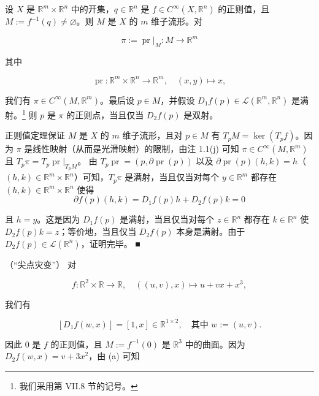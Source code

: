 \begin{example}

\begin{items}
\item

设 $ X $ 是 $ \mathbb{R}^m \times \mathbb{R}^n $ 中的开集，$ q \in \mathbb{R}^n $ 是 $ f \in C^\infty(X, \mathbb{R}^n) $ 的正则值，且 $ M := f^{-1}(q) \ne \varnothing $。则 $ M $ 是 $ X $ 的 $ m $ 维子流形。对

\[
\pi := \operatorname{pr}|_M : M \to \mathbb{R}^m
\]

其中

\[
\operatorname{pr}: \mathbb{R}^m \times \mathbb{R}^n \to \mathbb{R}^m, \quad (x, y) \mapsto x,
\]

我们有 $ \pi \in C^\infty(M, \mathbb{R}^m) $。最后设 $ p \in M $，并假设 $ D_1 f(p) \in \mathcal{L}(\mathbb{R}^m, \mathbb{R}^n) $ 是满射。\footnote{我们采用第 VII.8 节的记号。} 则 $ p $ 是 $ \pi $ 的正则点，当且仅当 $ D_2 f(p) $ 是双射。

\proofhead
正则值定理保证 $ M $ 是 $ X $ 的 $ m $ 维子流形，且对 $ p \in M $ 有 $ T_p M = \ker(T_p f) $。因为 $ \pi $ 是线性映射（从而是光滑映射）的限制，由注 1.1(j) 可知 $ \pi \in C^\infty(M, \mathbb{R}^m) $ 且 $ T_p \pi = T_p \operatorname{pr}|_{T_p M} $。
由 $ T_p \operatorname{pr} = (p, \partial \operatorname{pr}(p)) $ 以及 $ \partial \operatorname{pr}(p)(h, k) = h $（$ (h, k) \in \mathbb{R}^m \times \mathbb{R}^n $）可知，$ T_p \pi $ 是满射，当且仅当对每个 $ y \in \mathbb{R}^m $ 都存在 $ (h, k) \in \mathbb{R}^m \times \mathbb{R}^n $ 使得
\[
\partial f(p)(h, k) = D_1 f(p)h + D_2 f(p)k = 0
\]

且 $ h = y $。这是因为 $ D_1 f(p) $ 是满射，当且仅当对每个 $ z \in \mathbb{R}^n $ 都存在 $ k \in \mathbb{R}^n $ 使 $ D_2 f(p)k = z $；等价地，当且仅当 $ D_2 f(p) $ 本身是满射。由于 $ D_2 f(p) \in \mathcal{L}(\mathbb{R}^n) $，证明完毕。 \nobreak\hspace{0.35em}■

\item

（“尖点灾变”） 对

\[
f: \mathbb{R}^2 \times \mathbb{R} \to \mathbb{R}, \quad ((u, v), x) \mapsto u + vx + x^3,
\]

我们有

\[
[D_1 f(w, x)] = [1, x] \in \mathbb{R}^{1 \times 2}, \quad \text{其中 } w := (u, v).
\]

因此 $ 0 $ 是 $ f $ 的正则值，且 $ M := f^{-1}(0) $ 是 $ \mathbb{R}^3 $ 中的曲面。因为 $ D_2 f(w, x) = v + 3x^2 $，由 (a) 可知


\end{items}
\end{example}
